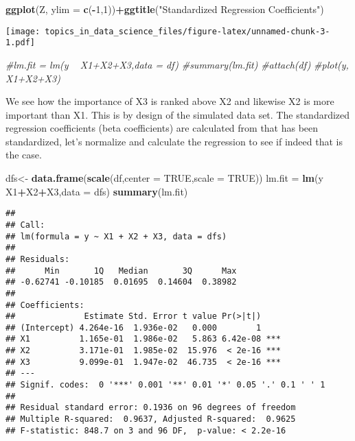 \documentclass[
  11pt,
]{book}
\newenvironment{Shaded}{\begin{snugshade}}{\end{snugshade}}
\newcommand{\CommentTok}[1]{\textcolor[rgb]{0.56,0.35,0.01}{\textit{#1}}}
\newcommand{\DataTypeTok}[1]{\textcolor[rgb]{0.13,0.29,0.53}{#1}}
\newcommand{\DecValTok}[1]{\textcolor[rgb]{0.00,0.00,0.81}{#1}}
\newcommand{\KeywordTok}[1]{\textcolor[rgb]{0.13,0.29,0.53}{\textbf{#1}}}
\newcommand{\NormalTok}[1]{#1}
\newcommand{\OperatorTok}[1]{\textcolor[rgb]{0.81,0.36,0.00}{\textbf{#1}}}
\newcommand{\OtherTok}[1]{\textcolor[rgb]{0.56,0.35,0.01}{#1}}
\newcommand{\StringTok}[1]{\textcolor[rgb]{0.31,0.60,0.02}{#1}}
\begin{document}
\begin{Shaded}
\begin{Highlighting}[]
\KeywordTok{ggplot}\NormalTok{(Z, }\DataTypeTok{ylim =} \KeywordTok{c}\NormalTok{(}\OperatorTok{-}\DecValTok{1}\NormalTok{,}\DecValTok{1}\NormalTok{))}\OperatorTok{+}\KeywordTok{ggtitle}\NormalTok{(}\StringTok{"Standardized Regression Coefficients"}\NormalTok{)}
\end{Highlighting}
\end{Shaded}

\texttt{[image: topics\_in\_data\_science\_files/figure-latex/unnamed-chunk-3-1.pdf]}

\begin{Shaded}
\begin{Highlighting}[]
\CommentTok{#lm.fit = lm(y ~ X1+X2+X3,data = df)}
\CommentTok{#summary(lm.fit)}
\CommentTok{#attach(df)}
\CommentTok{#plot(y, X1+X2+X3)}
\end{Highlighting}
\end{Shaded}

We see how the importance of X3 is ranked above X2 and likewise X2 is more important than X1. This is by design of the simulated data set. The standardized regression coefficients (beta coefficients) are calculated from that has been standardized, let's normalize and calculate the regression to see if indeed that is the case.

\begin{Shaded}
\begin{Highlighting}[]
\NormalTok{dfs<-}\StringTok{ }\KeywordTok{data.frame}\NormalTok{(}\KeywordTok{scale}\NormalTok{(df,}\DataTypeTok{center =} \OtherTok{TRUE}\NormalTok{,}\DataTypeTok{scale =} \OtherTok{TRUE}\NormalTok{))}
\NormalTok{lm.fit =}\StringTok{ }\KeywordTok{lm}\NormalTok{(y }\OperatorTok{~}\StringTok{ }\NormalTok{X1}\OperatorTok{+}\NormalTok{X2}\OperatorTok{+}\NormalTok{X3,}\DataTypeTok{data =}\NormalTok{ dfs)}
\KeywordTok{summary}\NormalTok{(lm.fit)}
\end{Highlighting}
\end{Shaded}

\begin{verbatim}
## 
## Call:
## lm(formula = y ~ X1 + X2 + X3, data = dfs)
## 
## Residuals:
##      Min       1Q   Median       3Q      Max 
## -0.62741 -0.10185  0.01695  0.14604  0.38982 
## 
## Coefficients:
##              Estimate Std. Error t value Pr(>|t|)    
## (Intercept) 4.264e-16  1.936e-02   0.000        1    
## X1          1.165e-01  1.986e-02   5.863 6.42e-08 ***
## X2          3.171e-01  1.985e-02  15.976  < 2e-16 ***
## X3          9.099e-01  1.947e-02  46.735  < 2e-16 ***
## ---
## Signif. codes:  0 '***' 0.001 '**' 0.01 '*' 0.05 '.' 0.1 ' ' 1
## 
## Residual standard error: 0.1936 on 96 degrees of freedom
## Multiple R-squared:  0.9637, Adjusted R-squared:  0.9625 
## F-statistic: 848.7 on 3 and 96 DF,  p-value: < 2.2e-16
\end{verbatim}
\end{document}
